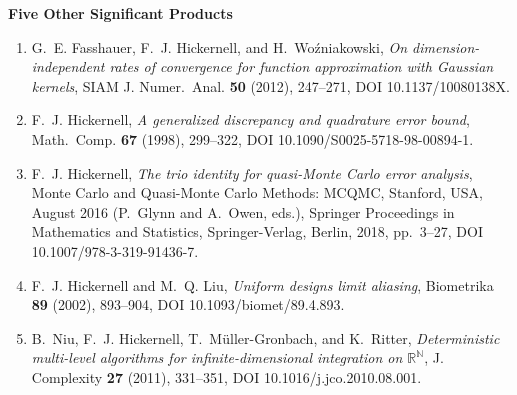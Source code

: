 \documentclass[11 pt]{NSFamsart}
\providecommand{\HickernellFJ}{Hickernell\xspace}
\begin{document}
\bigskip

\centerline{\textbf{Five Other Significant Products}}

\begin{enumerate} \renewcommand{\labelenumi}{[\arabic{enumi}]}
\setcounter{enumi}{5}

\item G.~E. Fasshauer, F.~J. Hickernell, and H.~Wo\'{z}niakowski, \emph{On   
dimension-independent rates of convergence for function approximation with {G}aussian kernels}, 
SIAM J. Numer.\ Anal. \textbf{50} (2012), 247--271, {DOI} 10.1137/10080138X.

\item F.~J. Hickernell, \emph{A generalized discrepancy and quadrature error bound},
  Math.\ Comp. \textbf{67} (1998), 299--322, {DOI}
  10.1090/S0025-5718-98-00894-1.
  

\item F.~J. \HickernellFJ, \emph{The trio identity for quasi-{M}onte {C}arlo error
	analysis}, {M}onte {C}arlo and Quasi-{M}onte {C}arlo Methods: {MCQMC},
{S}tanford, USA, {A}ugust 2016 (P.~Glynn and A.~Owen, eds.), Springer
Proceedings in Mathematics and Statistics, Springer-Verlag, Berlin, 2018, pp.\ 3--27, 
{DOI} 10.1007/978-3-319-91436-7.
  

\item F.~J. Hickernell and M.~Q. Liu, \emph{Uniform designs limit aliasing}, Biometrika \textbf{89} 
(2002), 893--904, {DOI} 10.1093/biomet/89.4.893.

\item B.~Niu, F.~J. Hickernell, T.~M\"uller-Gronbach, and K.~Ritter,
\emph{Deterministic multi-level algorithms for infinite-dimensional
	integration on {$\mathbb{R}^{\mathbb{N}}$}}, J. Complexity \textbf{27}
(2011), 331--351, {DOI} 10.1016/j.jco.2010.08.001.

\end{enumerate}
\end{document}
